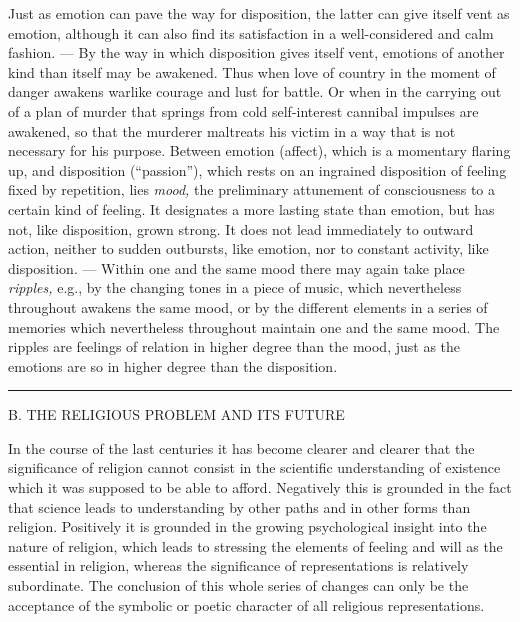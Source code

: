 \documentclass[12pt,a4paper,openany]{book}
\newcommand{\opage}[1]{\marginnote{\footnotesize\textit{[#1]}}}
\newcommand{\excerpthead}[1]{\par\bigskip\begin{center}#1\end{center}\nopagebreak\smallskip}
\newcommand{\sectionrule}{\par\begin{center}\rule{4em}{0.4pt}\end{center}}
\begin{document}
Just as emotion can pave the way for disposition, the latter can give itself vent as
emotion, although it can also find its satisfaction in a well-considered and calm
fashion. --- By the way in which disposition gives itself vent, emotions of another kind
than itself may be awakened. Thus when love of country in the moment of danger awakens
warlike courage and lust for battle. Or when in the carrying out of a plan of murder that
springs from cold self-interest cannibal impulses are awakened, so that the murderer
maltreats his victim in a way that is not necessary for his purpose. Between emotion
(affect), which is a momentary flaring up, and disposition (``passion''), which rests on
an ingrained disposition of feeling fixed by repetition, lies \textit{mood,} the
preliminary attunement of consciousness to a certain kind of feeling. It designates a more
lasting state than emotion, but has not, like disposition, grown strong. It does not lead
immediately to outward action, neither to sudden outbursts, like emotion, nor to constant
activity, like disposition. --- Within one and the same mood
\setcounter{footnote}{0}%
\opage{237}there may again take place \textit{ripples,} e.g., by the changing tones in a
piece of music, which nevertheless throughout awakens the same mood, or by the different
elements in a series of memories which nevertheless throughout maintain one and the same
mood. The ripples are feelings of relation in higher degree than the mood, just as the
emotions are so in higher degree than the disposition.

\sectionrule

\excerpthead{B. THE RELIGIOUS PROBLEM AND ITS FUTURE}


In the course of the last centuries it has become clearer and clearer that the
significance of religion cannot consist in the scientific understanding of existence which
it was supposed to be able to afford. Negatively this is grounded in the fact that
science leads to understanding by other paths and in other forms than religion.
Positively it is grounded in the growing psychological insight into the nature of
religion, which leads to stressing the elements of feeling and will as the essential in
religion, whereas the significance of representations is relatively subordinate. The
conclusion of this whole series of changes can only be the acceptance of the symbolic or
poetic character of all religious representations.
\end{document}

